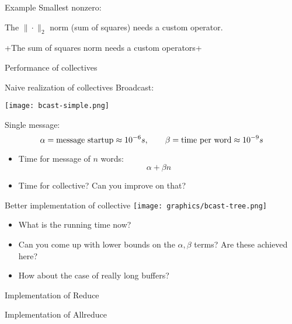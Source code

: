 
\begin{numberedframe}{Example}
  Smallest nonzero:
  
\end{numberedframe}

\begin{reviewframe}
  The $\|\cdot\|_2$ norm (sum of squares) needs a custom operator.
  
  \slackpollTF+The sum of squares norm needs a custom operators+
\end{reviewframe}

 {Performance of collectives}

\begin{numberedframe}{Naive realization of collectives}
  Broadcast:
  
  \texttt{[image: bcast-simple.png]}

  Single message:
  \[ \alpha=\hbox{message startup}\approx 10^{-6}s,\qquad
  \beta=\hbox{time per word}\approx 10^{-9}s
  \]
  \begin{itemize}
  \item Time for message of $n$ words: \[ \alpha +\beta n \]
  \item Time for collective? Can you improve on that?
  \end{itemize}

\end{numberedframe}

\begin{numberedframe}{Better implementation of collective}
  \texttt{[image: graphics/bcast-tree.png]}
  
  \begin{itemize}
  \item
    What is the running time now?
  \item
    Can you come up with lower bounds on the $\alpha,\beta$ terms? Are
    these achieved here?
  \item How about the case of really long buffers?
  \end{itemize}

\end{numberedframe}

\begin{numberedframe}{Implementation of Reduce}
  \footnotesize
  
\end{numberedframe}

\begin{numberedframe}{Implementation of Allreduce}
  \footnotesize
  
\end{numberedframe}

